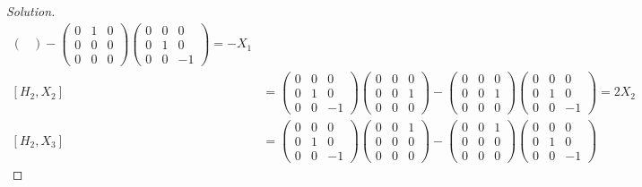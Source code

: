 \documentclass[12pt]{article}
\theoremstyle{definition}
\newenvironment{solution}
{\renewcommand\qedsymbol{$\blacksquare$}\begin{proof}[Solution]}
{\end{proof}}
\begin{document}
\begin{enumerate}
\begin{enumerate}[label=(\alph*)]
\begin{solution}
\begin{equation*}
\begin{split}
\begin{pmatrix}
                                \end{pmatrix}-\begin{pmatrix}0&1&0\\0&0&0\\0&0&0\end{pmatrix}
                                \begin{pmatrix}0&0&0\\0&1&0\\0&0&-1
                                \end{pmatrix}=-X_1 \\
                                [H_2, X_2] &=
                                \begin{pmatrix}0&0&0\\0&1&0\\0&0&-1
                                \end{pmatrix}\begin{pmatrix}0&0&0\\0&0&1\\0&0&0
                                \end{pmatrix}-\begin{pmatrix}0&0&0\\0&0&1\\0&0&0\end{pmatrix}
                                \begin{pmatrix}0&0&0\\0&1&0\\0&0&-1
                                \end{pmatrix} = 2X_2 \\
                                [H_2, X_3] &=
                                \begin{pmatrix}0&0&0\\0&1&0\\0&0&-1
                                \end{pmatrix}\begin{pmatrix}0&0&1\\0&0&0\\0&0&0
                                \end{pmatrix}-\begin{pmatrix}0&0&1\\0&0&0\\0&0&0\end{pmatrix}
                                \begin{pmatrix}0&0&0\\0&1&0\\0&0&-1

\end{pmatrix}
\end{split}
\end{equation*}
\end{solution}
\end{enumerate}
\end{enumerate}
\end{document}
